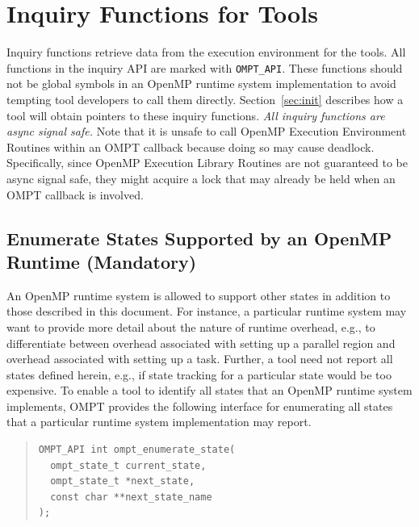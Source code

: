 \documentclass{article}
\begin{document}
 
 

\section{Inquiry Functions for Tools}
\label{sec:inquiry}

 Inquiry functions retrieve data from the execution environment for
 the tools. 
 All functions in the inquiry API are marked with \verb|OMPT_API|. These functions should not be global symbols in an OpenMP runtime system implementation to avoid tempting tool developers to call them directly. Section~\ref{sec:init} describes how a tool will obtain pointers to these inquiry functions.
 {\em All inquiry functions are async signal safe.} 
 Note that it is unsafe to call OpenMP Execution Environment Routines within an OMPT callback because doing so may cause deadlock. 
 Specifically, since OpenMP Execution Library Routines are not guaranteed to be async signal safe, they might acquire a lock that may already be held when an OMPT callback is involved.
 
 \subsection{Enumerate States Supported by an OpenMP Runtime (Mandatory)}
 \label{ompt_enumerate_state}
 
 An OpenMP runtime system is allowed to support other states in addition to those described in this document.
For instance, a particular runtime system may want to 
provide more detail about the nature of runtime overhead, 
e.g., to differentiate between  overhead associated with setting up a parallel region
and  overhead associated with setting up a task. Further, a tool need not report all states defined herein, e.g., if state tracking for a particular state would be too expensive.
To enable a tool to identify all states that an OpenMP runtime system implements, OMPT provides
the following interface for enumerating all states that a particular runtime system implementation may report.

\begin{quote}
\begin{verbatim}
OMPT_API int ompt_enumerate_state(
  ompt_state_t current_state, 
  ompt_state_t *next_state, 
  const char **next_state_name
);
\end{verbatim}
\end{quote}
\end{document}
